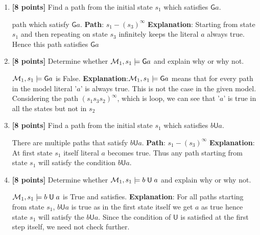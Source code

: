 \documentclass{article}
\def\Forever{\mathord{\mathsf{G}}}
\def\Until{\mathrel{\mathsf{U}}}
\begin{document}
\begin{enumerate}
  \item \textbf{[8 points]} Find a path from the initial state $s_1$
    which satisfies $\Forever a$.
    \begin{answer}
         path which satisfy $\Forever a$. \newline 
    	\textbf{Path}: $s_1-(s_3)^\infty$ \newline
    	\textbf{Explanation}: Starting from state $s_1$ and then repeating on state $s_3$
    	infinitely keeps the literal $a$ always true. Hence this path
    	satisfies $\Forever a$
    \end{answer}

  \item \textbf{[8 points]} Determine whether ${\cal M}_1, s_1 \models
    \Forever a$ and explain why or why not.
        \begin{answer}
    	 ${\cal M}_1, s_1 \models\Forever a$ is False. \newline
    	\textbf{Explanation}:${\cal M}_1, s_1 \models\Forever a$ means that for
    	every path in the model literal '$a$' is always true. This is not the case in
    	the given model. Considering the path $(s_1s_3s_2)^\infty$, which is loop, 
    	we can see that '$a$' is true in all the states but not in $s_2$  	 
    \end{answer}

  \item \textbf{[8 points]} Find a path from the initial state $s_1$
    which satisfies $b \Until a$.
        \begin{answer}
    	There are multiple paths that satisfy $b \Until a$. \newline
    	\textbf{Path}: $s_1-(s_3)^\infty$	\newline
    	\textbf{Explanation}: At first state $s_1$ itself  literal $a$ becomes
    	true. Thus any path starting from state $s_1$ will satisfy the condition $b \Until a$.
    \end{answer}

  \item \textbf{[8 points]} Determine whether ${\cal M}_1, s_1 \models
    b \Until a$ and explain why or why not.
    \begin{answer}
    	${\cal M}_1, s_1 \models b \Until a$ is True and satisfies.	\newline
    	\textbf{Explanation}: For all paths starting from state $s_1$, $b \Until a$
    	is true as in the first state itself we get $a$ as true hence state $s_1$
    	will satisfy the $b \Until a$. Since the condition of $\Until$ is satisfied at the first step itself,
    	we need not check further.
    \end{answer}


\end{enumerate}
\end{document}
